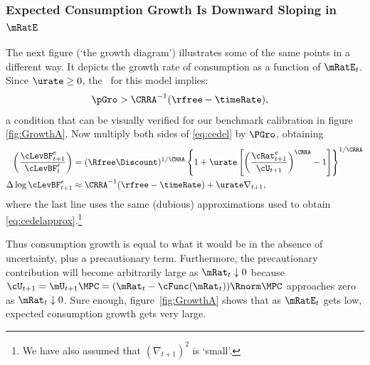 \documentclass{handout}
\begin{document}
\subsubsection{Expected Consumption Growth Is Downward Sloping in $\mRatE$}
The next figure (`the growth diagram') illustrates some of the same points in a different
way.  It depicts the growth rate of consumption as a function of $\mRatE_{t}$.
Since $\urate \geq 0$, the \GICPGro~for this model
implies:
\begin{equation}\begin{gathered}\begin{aligned}
  \pGro & >  \CRRA^{-1}(\rfree-\timeRate) ,
\end{aligned}\end{gathered}\end{equation}
a condition that can be visually verified for our benchmark calibration in figure \ref{fig:GrowthA}.  Now multiply both sides of \eqref{eq:cedel} by $\PGro$, obtaining
\begin{equation}\begin{gathered}\begin{aligned}
        \left(\frac{\cLevBF^{e}_{t+1}}{\cLevBF^{e}_{t}}\right) & =  (\Rfree\Discount)^{1/\CRRA} \left\{1+\urate\left[\left(\frac{{\cRat}^{e}_{t+1}}{\cU_{t+1}}\right)^{\CRRA}-1\right]\right\}^{1/\CRRA} \label{eq:cLevGro}
\\       \Delta \log \cLevBF^{e}_{t+1} & \approx  \CRRA^{-1}(\rfree-\timeRate) +  \urate \nabla _{t+1}, %
\end{aligned}\end{gathered}\end{equation}
where the last line uses the same (dubious) approximations used to obtain
\eqref{eq:cedelapprox}.\footnote{We have also assumed that $(\nabla _{t+1})^{2}$ is `small'.}

Thus consumption growth is equal to what it would be in the absence of
uncertainty, plus a precautionary term.  Furthermore, 
the precautionary contribution will become arbitrarily large as $\mRat_{t}
\downarrow 0$ because $\cU_{t+1} = \mU_{t+1}\MPCU  =
(\mRat_{t}-\cFunc(\mRat_{t}))\Rnorm\MPCU$ approaches zero as $\mRat_{t} \downarrow 0$.  Sure
enough, figure~\ref{fig:GrowthA} shows that as $\mRatE_{t}$
gets low, expected consumption growth gets very large.
\end{document}

